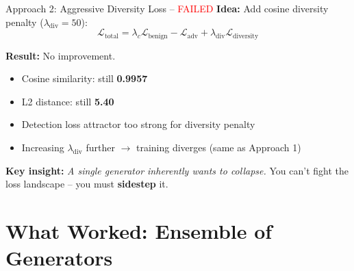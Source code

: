 \documentclass[aspectratio=169,11pt]{beamer}
\begin{document}
\begin{frame}{Approach 2: Aggressive Diversity Loss -- \textcolor{red}{FAILED}}
\textbf{Idea:} Add cosine diversity penalty ($\lambda_{\text{div}} = 50$):
\begin{equation*}
    \mathcal{L}_{\text{total}} = \lambda_c \mathcal{L}_{\text{benign}} - \mathcal{L}_{\text{adv}} + \lambda_{\text{div}} \mathcal{L}_{\text{diversity}}
\end{equation*}

\vspace{0.3cm}
\textbf{Result:} No improvement.
\begin{itemize}
    \item Cosine similarity: still \textbf{0.9957}
    \item L2 distance: still \textbf{5.40}
    \item Detection loss attractor too strong for diversity penalty
    \item Increasing $\lambda_{\text{div}}$ further $\to$ training diverges (same as Approach 1)
\end{itemize}

\vspace{0.3cm}
\textbf{Key insight:} \textit{A single generator inherently wants to collapse.} You can't fight the loss landscape -- you must \textbf{sidestep} it.
\end{frame}

\section{What Worked: Ensemble of Generators}
\end{document}
